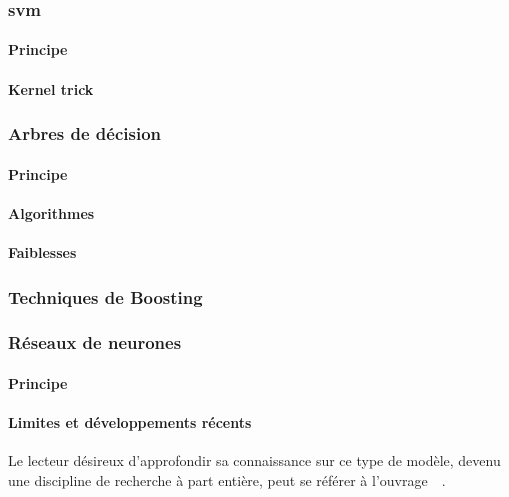 \subsubsection{\Gls{svm}}

\paragraph{Principe}

\paragraph{Kernel trick}


\subsubsection{Arbres de décision}

\paragraph{Principe}

\paragraph{Algorithmes}

\paragraph{Faiblesses}

\subsubsection{Techniques de Boosting}


\subsubsection{Réseaux de neurones}

\paragraph{Principe}

\paragraph{Limites et développements récents}
Le lecteur désireux d'approfondir sa connaissance sur ce type de modèle, devenu une discipline de recherche à part entière, peut se référer à l'ouvrage~~\cite{goodfellow2016deep}.

